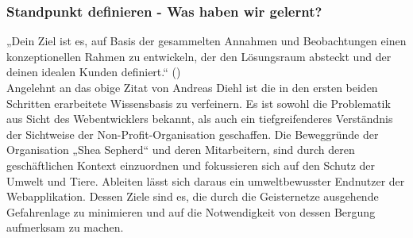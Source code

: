 \documentclass[11pt]{article}
\begin{document}
    \subsubsection{Standpunkt definieren - Was haben wir gelernt?}
    „Dein Ziel ist es, auf Basis der gesammelten Annahmen und Beobachtungen einen konzeptionellen Rahmen zu entwickeln, der den Lösungsraum absteckt und der deinen idealen Kunden definiert.“ (\cite{design_thinking})
    \\[1\baselineskip]
    Angelehnt an das obige Zitat von Andreas Diehl ist die in den ersten beiden Schritten erarbeitete Wissensbasis zu verfeinern. Es ist sowohl die Problematik aus Sicht des Webentwicklers bekannt,
    als auch ein tiefgreifenderes Verständnis der Sichtweise der Non-Profit-Organisation geschaffen.
    Die Beweggründe der Organisation „Shea Sepherd“ und deren Mitarbeitern, sind durch deren geschäftlichen Kontext einzuordnen und fokussieren
    sich auf den Schutz der Umwelt und Tiere.
    Ableiten lässt sich daraus ein umweltbewusster Endnutzer der Webapplikation. Dessen Ziele sind es, die durch die Geisternetze ausgehende Gefahrenlage zu minimieren und auf die Notwendigkeit von dessen Bergung aufmerksam zu machen. 
\end{document}
